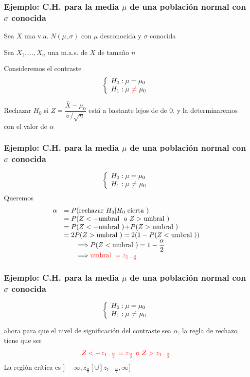 \documentclass[12pt,t]{beamer}\usepackage[]{graphicx}\usepackage[]{color}
\newcommand{\red}[1]{\textcolor{red}{#1}}
\renewcommand{\emph}[1]{{\color{red}#1}}
\theoremstyle{plain}
\theoremstyle{definition}
\begin{document}
\begin{frame}
\frametitle{Ejemplo: C.H. para la media   $\mu$ de una población   normal con $\sigma$ conocida}

Sea $X$ una v.a. $N(\mu,\sigma)$ con $\mu$ desconocida y $\sigma$ conocida
\medskip

Sea  $X_{1},\ldots,X_{n}$ una m.a.s. de $X$ de tamaño $n$
\medskip

Consideremos  el contraste
$$
\left\{\begin{array}{l}
H_{0}:\mu=\mu_{0}\\ H_{1}:\mu\ \red{\neq}\ \mu_{0}
\end{array}
\right.
$$
\medskip

Rechazar $H_{0}$ si $Z=\dfrac{\overline{X}-\mu_{0}}{{\sigma}/{\sqrt{n}}}$ está a \emph{bastante lejos de} de 0, y la determinaremos con el valor de  $\alpha$
\end{frame}

\begin{frame}
\frametitle{Ejemplo: C.H. para la media   $\mu$ de una población   normal con $\sigma$ conocida}


$$
\left\{\begin{array}{l}
H_{0}:\mu=\mu_{0}\\ H_{1}:\mu\ \red{\neq}\ \mu_{0}
\end{array}
\right.
$$
Queremos
$$
\begin{array}{rl}
\alpha & =P(\mbox{rechazar   } H_{0}| H_{0} \mbox{ cierta })\\ 
& =P(Z<-\mbox{umbral  }\mbox{ o }Z>\mbox{umbral  })\\
& =P(Z<-\mbox{umbral  })\!+\!P(Z>\mbox{umbral  })\\
& = 2P(Z>\mbox{umbral  })=2(1-P(Z<\mbox{umbral  }))\\
& \qquad \Longrightarrow P(Z<\mbox{umbral  })=1-\dfrac{\alpha}{2}\\
&  \qquad \Longrightarrow \red{\mbox{umbral  }=z_{1-\frac{\alpha}{2}}}
\end{array}
$$
\end{frame}

\begin{frame}
\frametitle{Ejemplo: C.H. para la media   $\mu$ de una población   normal con $\sigma$ conocida}


$$
\left\{\begin{array}{l}
H_{0}:\mu=\mu_{0}\\ H_{1}:\mu\ \red{\neq}\ \mu_{0}
\end{array}
\right.
$$
\medskip

ahora para que el nivel de significación del contraste sea $\alpha$,  la
regla de rechazo tiene que ser
$$
\red{Z<-z_{1-\frac{\alpha}2}=z_{\frac{\alpha}2}\mbox{ o }Z>z_{1-\frac{\alpha}2}}
$$
La región crítica es $]-\infty,z_{\frac\alpha2}[\cup ]z_{1-\frac{\alpha}2},\infty[$
\end{frame}
\end{document}
